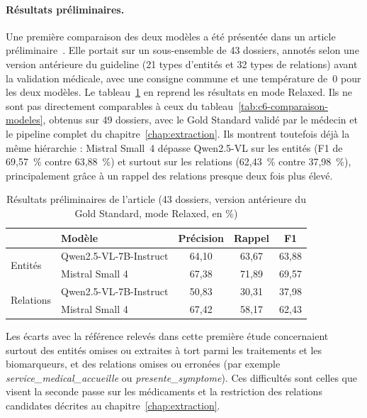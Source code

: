 \paragraph{Résultats préliminaires.} Une première comparaison des deux modèles a été présentée dans un article préliminaire~\cite{dridi2026jdse}. Elle portait sur un sous-ensemble de 43 dossiers, annotés selon une version antérieure du guideline (21 types d'entités et 32 types de relations) avant la validation médicale, avec une consigne commune et une température de~0 pour les deux modèles. Le tableau~\ref{tab:c6-preliminaire} en reprend les résultats en mode Relaxed. Ils ne sont pas directement comparables à ceux du tableau~\ref{tab:c6-comparaison-modeles}, obtenus sur 49 dossiers, avec le Gold Standard validé par le médecin et le pipeline complet du chapitre~\ref{chap:extraction}. Ils montrent toutefois déjà la même hiérarchie : Mistral Small~4 dépasse Qwen2.5-VL sur les entités (F1 de 69,57~\% contre 63,88~\%) et surtout sur les relations (62,43~\% contre 37,98~\%), principalement grâce à un rappel des relations presque deux fois plus élevé.

\begin{table}[H]
\centering
\caption{Résultats préliminaires de l'article (43 dossiers, version antérieure du Gold Standard, mode Relaxed, en \%)}\label{tab:c6-preliminaire}
\small
\begin{tabular}{llccc}
\toprule
& \textbf{Modèle} & \textbf{Précision} & \textbf{Rappel} & \textbf{F1} \\
\midrule
\multirow{2}{*}{Entités} & Qwen2.5-VL-7B-Instruct & 64,10 & 63,67 & 63,88 \\
 & Mistral Small 4 & 67,38 & 71,89 & 69,57 \\
\midrule
\multirow{2}{*}{Relations} & Qwen2.5-VL-7B-Instruct & 50,83 & 30,31 & 37,98 \\
 & Mistral Small 4 & 67,42 & 58,17 & 62,43 \\
\bottomrule
\end{tabular}
\end{table}

Les écarts avec la référence relevés dans cette première étude concernaient surtout des entités omises ou extraites à tort parmi les traitements et les biomarqueurs, et des relations omises ou erronées (par exemple \emph{service\_medical\_accueille} ou \emph{presente\_symptome}). Ces difficultés sont celles que visent la seconde passe sur les médicaments et la restriction des relations candidates décrites au chapitre~\ref{chap:extraction}.

